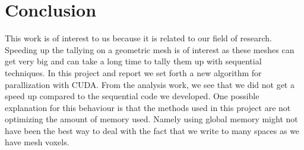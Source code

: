 \section{Conclusion}
This work is of interest to us because it is related to our field of 
research. Speeding up the tallying on a geometric mesh is of interest 
as these meshes can get very big and can take a long time to tally 
them up with sequential techniques. In this project and report we set
forth a new algorithm for parallization with CUDA. 
From the analysis work, we see that we did not get a speed up compared 
to the sequential code we developed. One possible explanation for this 
behaviour is that the methods used in this project are not optimizing 
the amount of memory used. Namely using global memory might not have 
been the best way to deal with the fact that we write to many spaces 
as we have mesh voxels. 
